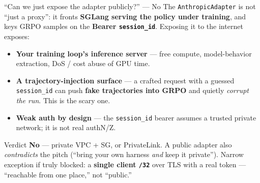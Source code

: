 \documentclass[aspectratio=169]{beamer}
\begin{document}
\begin{frame}{``Can we just expose the adapter publicly?'' --- No}
  \footnotesize The \texttt{AnthropicAdapter} is not ``just a proxy'': it fronts \textbf{SGLang serving
  the policy under training}, and keys GRPO samples on the \textbf{Bearer \texttt{session\_id}}.
  Exposing it to the internet exposes:
  \vspace{0.3em}
  \begin{itemize}\setlength\itemsep{0.4em}
    \item \textbf{Your training loop's inference server} --- free compute, model-behavior extraction,
      DoS / cost abuse of GPU time.
    \item \textbf{A trajectory-injection surface} --- a crafted request with a guessed \texttt{session\_id}
      can push \textbf{fake trajectories into GRPO} and quietly \emph{corrupt the run}. This is the scary one.
    \item \textbf{Weak auth by design} --- the \texttt{session\_id} bearer assumes a trusted private
      network; it is not real authN/Z.
  \end{itemize}
  \vspace{0.3em}
  \begin{block}{Verdict}
    \footnotesize \textbf{No} --- private VPC + SG, or PrivateLink. A public adapter also \emph{contradicts}
    the pitch (``bring your own harness \emph{and} keep it private''). Narrow exception if truly blocked:
    a \textbf{single client \texttt{/32}} over TLS with a real token --- ``reachable from one place,'' not ``public.''
  \end{block}
\end{frame}
\end{document}
